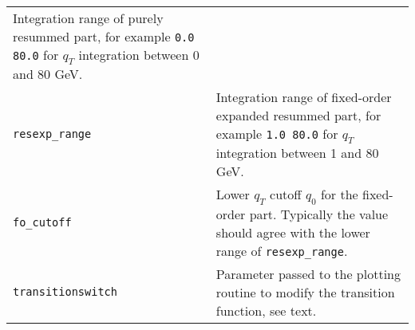 \begin{longtable}{p{1.5cm}p{12cm}}
\begin{minipage}[t]{0.71\columnwidth}
Integration range of purely resummed part, for example \texttt{0.0 80.0}
for \(q_T\) integration between 0 and 80 GeV.\strut
\end{minipage}\tabularnewline
\begin{minipage}[t]{0.24\columnwidth}\raggedright
\texttt{resexp\_range}\strut
\end{minipage} & \begin{minipage}[t]{0.71\columnwidth}\raggedright
Integration range of fixed-order expanded resummed part, for example
\texttt{1.0 80.0} for \(q_T\) integration between 1 and 80 GeV.\strut
\end{minipage}\tabularnewline
\begin{minipage}[t]{0.24\columnwidth}\raggedright
\texttt{fo\_cutoff}\strut
\end{minipage} & \begin{minipage}[t]{0.71\columnwidth}\raggedright
Lower \(q_T\) cutoff $q_0$ for the fixed-order part. %
Typically the value should agree with the lower range of \texttt{resexp\_range}.\strut
\end{minipage}\tabularnewline
\begin{minipage}[t]{0.24\columnwidth}\raggedright
\texttt{transitionswitch}\strut
\end{minipage} & \begin{minipage}[t]{0.71\columnwidth}\raggedright
Parameter passed to the plotting routine to modify the transition
function, see text.\strut
\end{minipage}\tabularnewline
\bottomrule
\end{longtable}
